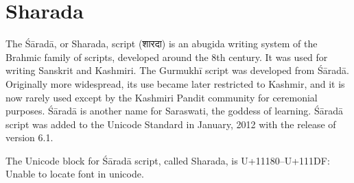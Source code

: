 

\section{Sharada}
\label{s:sharada}
The Śāradā, or Sharada, script (शारदा) is an abugida writing system of the Brahmic family of scripts, developed around the 8th century. It was used for writing Sanskrit and Kashmiri. The Gurmukhī script was developed from Śāradā. Originally more widespread, its use became later restricted to Kashmir, and it is now rarely used except by the Kashmiri Pandit community for ceremonial purposes. Śāradā is another name for Saraswati, the goddess of learning.
Śāradā script was added to the Unicode Standard in January, 2012 with the release of version 6.1.

The Unicode block for Śāradā script, called Sharada, is U+11180–U+111DF: Unable to locate font in unicode.














\egroup